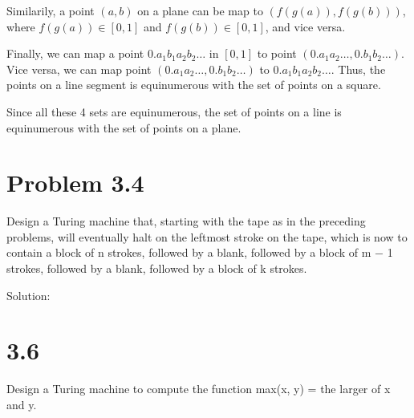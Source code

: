 \documentclass{ctexart}
\begin{document}
Similarily, a point $(a, b)$ on a plane can be map to $(f(g(a)), f(g(b)))$, where $f(g(a)) \in [0, 1]$ and $f(g(b)) \in [0, 1]$, and vice versa.

Finally, we can map a point $0.a_1 b_1 a_2 b_2 \dots$ in $[0, 1]$ to point $(0.a_1 a_2 \dots, 0.b_1 b_2 \dots)$. Vice versa, we can map point $(0.a_1 a_2 \dots, 0.b_1 b_2 \dots)$ to $0.a_1 b_1 a_2 b_2 \dots$. Thus, the points on a line segment is equinumerous with the set of points on a square.

Since all these 4 sets are equinumerous, the set of points on a line is equinumerous with the set of points on a plane.

\section*{Problem 3.4}
Design a Turing machine that, starting with the tape as in the preceding problems, will eventually halt on the leftmost stroke on the tape, which is now to contain a block of n strokes, followed by a blank, followed by a block of m − 1 strokes, followed by a blank, followed by a block of k strokes.

Solution:


\section*{3.6}
Design a Turing machine to compute the function max(x, y) = the larger of x and y.
\end{document}
